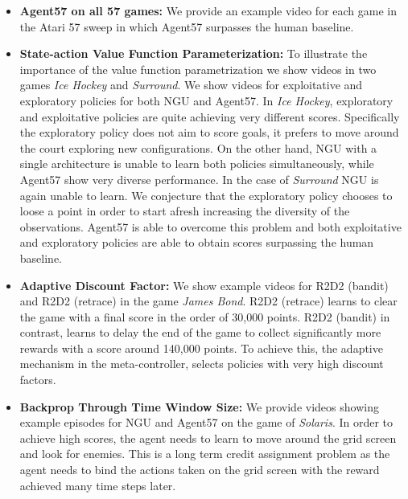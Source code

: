 \documentclass{article}
\begin{document}
\begin{itemize}

\item {\bf Agent57 on all 57 games:} We provide an example video for each game in the Atari 57 sweep in which Agent57 surpasses the human baseline.

\item {\bf State-action Value Function Parameterization:} To illustrate the importance of the value function parametrization we show videos in two games \textit{Ice Hockey} and \textit{Surround}. We show videos for exploitative and exploratory policies for both NGU and Agent57. In \textit{Ice Hockey}, exploratory and exploitative policies are quite achieving very different scores. Specifically the exploratory policy does not aim to score goals, it prefers to move around the court exploring new configurations. On the other hand, NGU with a single architecture is unable to learn both policies simultaneously, while Agent57 show very diverse performance. In the case of \textit{Surround} NGU is again unable to learn. We conjecture that the exploratory policy chooses to loose a point in order to start afresh increasing the diversity of the observations. Agent57 is able to overcome this problem and both exploitative and exploratory policies are able to obtain scores surpassing the human baseline.

\item {\bf Adaptive Discount Factor:} We show example videos for R2D2 (bandit) and R2D2 (retrace) in the game \textit{James Bond}. R2D2 (retrace) learns to clear the game with a final score in the order of 30,000 points. R2D2 (bandit) in contrast, learns to delay the end of the game to collect significantly more rewards with a score around 140,000 points. To achieve this, the adaptive mechanism in the meta-controller, selects policies with very high discount factors.

\item {\bf Backprop Through Time Window Size:} We provide videos showing example episodes for NGU and Agent57 on the game of \textit{Solaris}. In order to achieve high scores, the agent needs to learn to move around the grid screen and look for enemies. This is a long term credit assignment problem as the agent needs to bind the actions taken on the grid screen with the reward achieved many time steps later.

\end{itemize}
 
\end{document}
